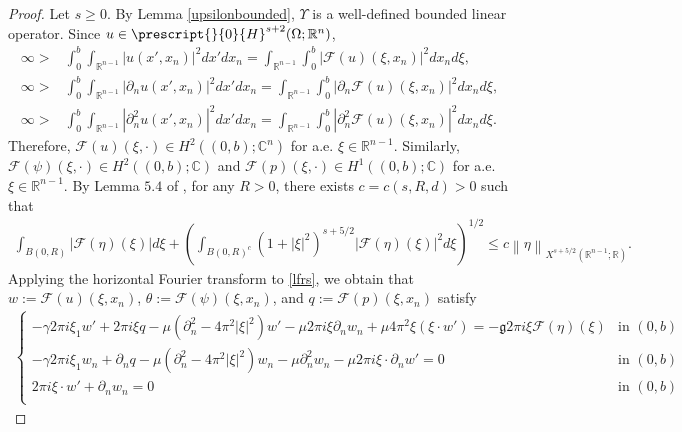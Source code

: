 \documentclass[11pt,letterpaper,reqno]{amsart}
\numberwithin{equation}{section}
\newcommand{\abs}[1]{\left\lvert#1\right\rvert}
\newcommand{\norm}[1]{\left\lVert#1\right\rVert}
\begin{document}
\begin{proof}
    Let \(s \geq 0\). By Lemma \ref{upsilonbounded}, \(\Upsilon\) is a well-defined bounded linear operator. Since \(u \in \prescript{}{0}{H}^{s+2}(\Omega;\mathbb{R}^{n})\),
    \begin{align}
        \infty>&\int_{0}^{b}\int_{\mathbb{R}^{n-1}}\abs{u(x',x_{n})}^{2}dx'dx_{n}=\int_{\mathbb{R}^{n-1}}\int_{0}^{b}\abs{\mathcal{F}(u)(\xi,x_{n})}^{2}dx_{n}d\xi, \nonumber\\
        \infty>&\int_{0}^{b}\int_{\mathbb{R}^{n-1}}\abs{\partial_{n}u(x',x_{n})}^{2}dx'dx_{n}=\int_{\mathbb{R}^{n-1}}\int_{0}^{b}\abs{\partial_{n}\mathcal{F}(u)(\xi,x_{n})}^{2}dx_{n}d\xi, \nonumber\\
        \infty>&\int_{0}^{b}\int_{\mathbb{R}^{n-1}}\abs{\partial_{n}^{2}u(x',x_{n})}^{2}dx'dx_{n}=\int_{\mathbb{R}^{n-1}}\int_{0}^{b}\abs{\partial_{n}^{2}\mathcal{F}(u)(\xi,x_{n})}^{2}dx_{n}d\xi.
    \end{align}
    Therefore, \(\mathcal{F}(u)(\xi,\cdot) \in H^{2}((0,b);\mathbb{C}^{n})\) for a.e. \(\xi \in \mathbb{R}^{n-1}\). Similarly, \(\mathcal{F}(\psi)(\xi,\cdot) \in H^{2}((0,b);\mathbb{C})\) and \(\mathcal{F}(p)(\xi,\cdot) \in H^{1}((0,b);\mathbb{C})\) for a.e. \(\xi \in \mathbb{R}^{n-1}\). By Lemma \(5.4\) of \cite{leoni2023traveling}, for any \(R>0\), there exists \(c=c(s,R,d)>0\) such that
    \begin{align}
        \int_{B(0,R)}\abs{\mathcal{F}(\eta)(\xi)}d\xi+\left(\int_{B(0,R)^{c}}(1+\abs{\xi}^{2})^{s+5/2}\abs{\mathcal{F}(\eta)(\xi)}^{2}d\xi\right)^{1/2} \leq c\norm{\eta}_{X^{s+5/2}(\mathbb{R}^{n-1};\mathbb{R})}.
    \end{align}
    Applying the horizontal Fourier transform to \eqref{lfrs}, we obtain that \(w:=\mathcal{F}(u)(\xi,x_{n})\), \(\theta:=\mathcal{F}(\psi)(\xi,x_{n})\), and \(q:=\mathcal{F}(p)(\xi,x_{n})\) satisfy
    \begin{align} \label{hftsys}
        \begin{cases}
            -\gamma2\pi i \xi_{1}w'+2\pi i \xi q-\mu(\partial_{n}^{2}-4\pi^{2}\abs{\xi}^{2})w'-\mu 2\pi i \xi \partial_{n}w_{n}+\mu 4\pi^{2}\xi(\xi \cdot w')=-\mathfrak{g}2\pi i \xi\mathcal{F}(\eta)(\xi) &\mbox{in \((0,b)\)} \\
            -\gamma 2\pi i \xi_{1}w_{n}+\partial_{n}q-\mu(\partial_{n}^{2}-4\pi^{2}\abs{\xi}^{2})w_{n}-\mu\partial_{n}^{2}w_{n}-\mu 2\pi i \xi \cdot \partial_{n}w'=0 &\mbox{in \((0,b)\)}\\
            2\pi i \xi \cdot w'+\partial_{n}w_{n}=0 &\mbox{in \((0,b)\)} \\

\end{cases}
\end{align}
\end{proof}
\end{document}
